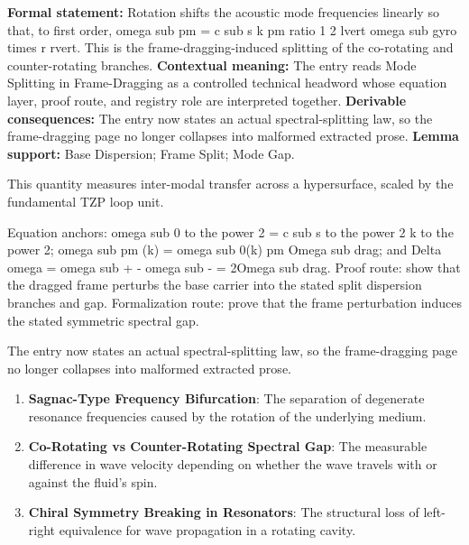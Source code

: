 \begingroup\footnotesize\setlength{\emergencystretch}{3em}\sloppy
\textbf{Formal statement:} Rotation shifts the acoustic mode frequencies linearly so that, to first order, omega sub pm = c sub s k pm ratio 1 2 lvert omega sub gyro times r rvert. This is the frame-dragging-induced splitting of the co-rotating and counter-rotating branches. \textbf{Contextual meaning:} The entry reads Mode Splitting in Frame-Dragging as a controlled technical headword whose equation layer, proof route, and registry role are interpreted together. \textbf{Derivable consequences:} The entry now states an actual spectral-splitting law, so the frame-dragging page no longer collapses into malformed extracted prose. \textbf{Lemma support:} Base Dispersion; Frame Split; Mode Gap.\par
\endgroup

This quantity measures inter-modal transfer across a hypersurface, scaled by the fundamental TZP loop unit.

Equation anchors: omega sub 0 to the power 2 = c sub s to the power 2 k to the power 2; omega sub pm (k) = omega sub 0(k) pm Omega sub drag; and Delta omega = omega sub + - omega sub - = 2Omega sub drag. Proof route: show that the dragged frame perturbs the base carrier into the stated split dispersion branches and gap. Formalization route: prove that the frame perturbation induces the stated symmetric spectral gap.

The entry now states an actual spectral-splitting law, so the frame-dragging page no longer collapses into malformed extracted prose.
\endgroup

\begin{enumerate}[leftmargin=1.6em,itemsep=6pt,topsep=4pt]
\item \textbf{Sagnac-Type Frequency Bifurcation}: The separation of degenerate resonance frequencies caused by the rotation of the underlying medium.
\item \textbf{Co-Rotating vs Counter-Rotating Spectral Gap}: The measurable difference in wave velocity depending on whether the wave travels with or against the fluid's spin.
\item \textbf{Chiral Symmetry Breaking in Resonators}: The structural loss of left-right equivalence for wave propagation in a rotating cavity.
\end{enumerate}

